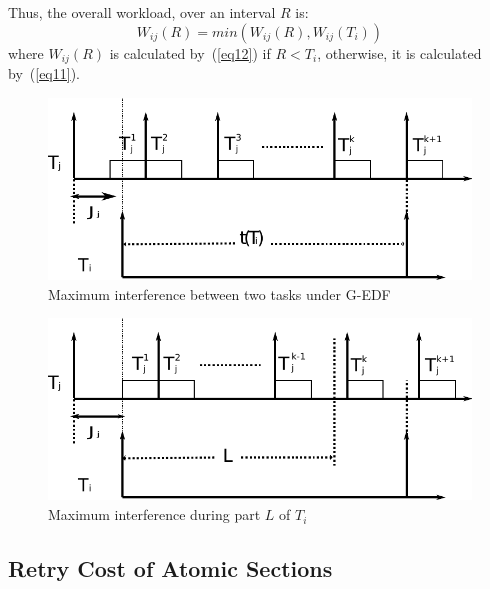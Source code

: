 \documentclass{sig-alternate}
\begin{document}
Thus, the overall workload, over an interval $R$ is:
\begin{equation}
W_{ij}\left(R\right)=min\left(W_{ij}\left(R\right),W_{ij}\left(T_{i}\right)\right)\label{eq13}\end{equation}
where $W_{ij}(R)$ is calculated by~(\ref{eq12}) if $R<T_i$, otherwise, it is calculated by~(\ref{eq11}).

\begin{figure}%
\centering
\includegraphics[bb=0bp 0bp 542bp 162bp,scale=0.5]{figures/figure9-a}
\caption{\label{fig1} Maximum interference between two tasks under G-EDF}
\end{figure}


\begin{figure}
\centering
\includegraphics[bb=0bp 0bp 542bp 162bp,scale=0.5]{figures/figure9-b}
\caption{\label{fig2}Maximum interference during part $L$ of $T_{i}$}
\end{figure}



\subsection{Retry Cost of Atomic Sections}
\end{document}

